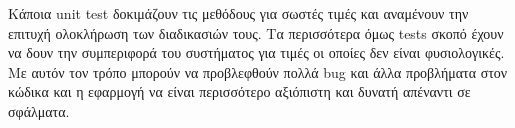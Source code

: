 

Κάποια unit test δοκιμάζουν τις μεθόδους για σωστές τιμές και αναμένουν την επιτυχή ολοκλήρωση των διαδικασιών τους. Τα περισσότερα όμως tests σκοπό έχουν να δουν την συμπεριφορά του συστήματος για τιμές οι οποίες δεν είναι φυσιολογικές. Με αυτόν τον τρόπο μπορούν να προβλεφθούν πολλά bug και άλλα προβλήματα στον κώδικα και η εφαρμογή να είναι περισσότερο αξιόπιστη και δυνατή απέναντι σε σφάλματα.